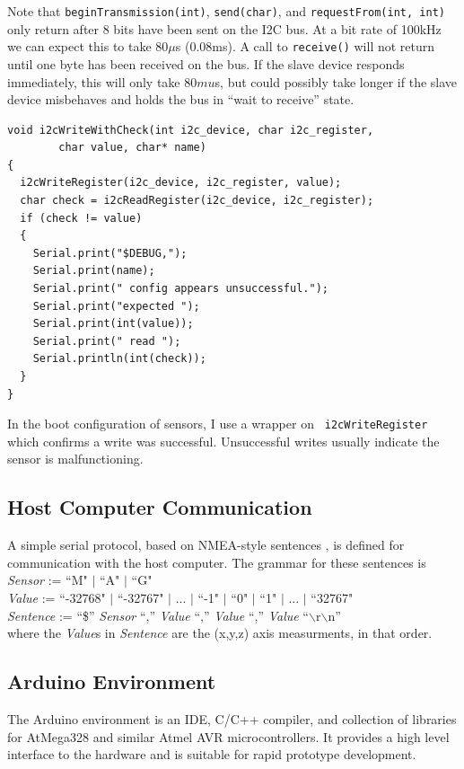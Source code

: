 \documentclass[12pt]{report}
\begin{document}
Note that \lstinline$beginTransmission(int)$, \lstinline$send(char)$, and \lstinline$requestFrom(int, int)$ only return after 8 bits have been sent on the I2C bus. At a bit rate of 100kHz we can expect this to take 80$\mu$s (0.08ms). A call to \lstinline$receive()$ will not return until one byte has been received on the bus. If the slave device responds immediately, this will only take 80$mu$s, but could possibly take longer if the slave device misbehaves and holds the bus in ``wait to receive'' state.
\begin{lstlisting}
void i2cWriteWithCheck(int i2c_device, char i2c_register, 
        char value, char* name)
{
  i2cWriteRegister(i2c_device, i2c_register, value);
  char check = i2cReadRegister(i2c_device, i2c_register);
  if (check != value)
  {
    Serial.print("$DEBUG,");
    Serial.print(name);
    Serial.print(" config appears unsuccessful.");
    Serial.print("expected ");
    Serial.print(int(value));
    Serial.print(" read ");
    Serial.println(int(check));
  }
}
\end{lstlisting}
In the boot configuration of sensors, I use a wrapper on \lstinline$ i2cWriteRegister $ which confirms a write was successful. Unsuccessful writes usually indicate the sensor is malfunctioning.


\subsection{Host Computer Communication}
A simple serial protocol, based on NMEA-style sentences \cite{gpsinfonmea}, is defined for communication with the host computer. The grammar for these sentences is \\
\emph{Sensor} := ``M" $|$ ``A" $|$ ``G" \\
\emph{Value} := ``-32768" $|$ ``-32767" $|$ ... $|$ ``-1" $|$ ``0" $|$ ``1" $|$ ... $|$ ``32767" \\
\emph{Sentence} := ``\$'' \emph{Sensor} ``,'' \emph{Value} ``,'' \emph{Value} ``,'' \emph{Value} ``$\backslash$r$\backslash$n'' \\
where the \emph{Value}s in \emph{Sentence} are the (x,y,z) axis measurments, in that order.

\subsection{Arduino Environment}
The Arduino environment is an IDE, C/C++ compiler, and collection of libraries for AtMega328 and similar Atmel AVR microcontrollers. It provides a high level interface to the hardware and is suitable for rapid prototype development. 
\end{document}
